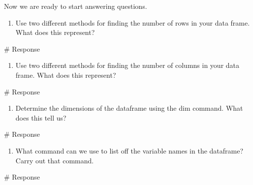 \documentclass[
  letterpaper,
  DIV=11,
  numbers=noendperiod]{scrreprt}
\newenvironment{Shaded}{\begin{snugshade}}{\end{snugshade}}
\newcommand{\CommentTok}[1]{\textcolor[rgb]{0.37,0.37,0.37}{#1}}
\providecommand{\tightlist}{%
  \setlength{\itemsep}{0pt}\setlength{\parskip}{0pt}}\usepackage{longtable,booktabs,array}
\begin{document}
Now we are ready to start answering questions.

\begin{enumerate}
\def\labelenumi{\arabic{enumi}.}
\tightlist
\item
  Use two different methods for finding the number of rows in your data
  frame. What does this represent?
\end{enumerate}

\begin{Shaded}
\begin{Highlighting}[]
\CommentTok{\# Response}
\end{Highlighting}
\end{Shaded}

\begin{enumerate}
\def\labelenumi{\arabic{enumi}.}
\setcounter{enumi}{1}
\tightlist
\item
  Use two different methods for finding the number of columns in your
  data frame. What does this represent?
\end{enumerate}

\begin{Shaded}
\begin{Highlighting}[]
\CommentTok{\# Response}
\end{Highlighting}
\end{Shaded}

\begin{enumerate}
\def\labelenumi{\arabic{enumi}.}
\setcounter{enumi}{2}
\tightlist
\item
  Determine the dimensions of the dataframe using the dim command. What
  does this tell us?
\end{enumerate}

\begin{Shaded}
\begin{Highlighting}[]
\CommentTok{\# Response}
\end{Highlighting}
\end{Shaded}

\begin{enumerate}
\def\labelenumi{\arabic{enumi}.}
\setcounter{enumi}{3}
\tightlist
\item
  What command can we use to list off the variable names in the
  dataframe? Carry out that command.
\end{enumerate}

\begin{Shaded}
\begin{Highlighting}[]
\CommentTok{\# Response}
\end{Highlighting}
\end{Shaded}
\end{document}
